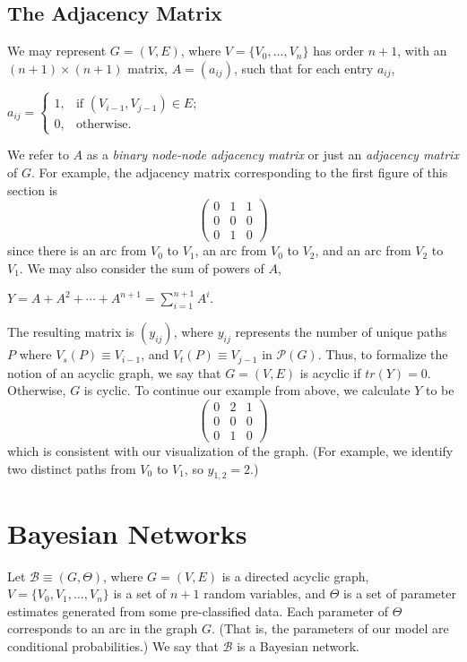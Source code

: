 \documentclass[12pt,twoside]{reedthesis}
\begin{document}
	\subsection*{The Adjacency Matrix}
	We may represent $G=(V,E)$, where $V = \{V_0, \ldots, V_{n} \}$ has order $n+1$, with an $(n+1) \times (n+1)$ matrix, $A = (a_{ij})$, such that for each entry $a_{ij}$, 
	\begin{center}
	 	$a_{ij} = 
		\begin{cases} 1, & \textrm{if\ \ \ } (V_{i-1},V_{j-1}) \in E; \\
		0, & \textrm{otherwise}. \end{cases}$
	 \end {center}
	We refer to $A$ as a {\em binary node-node adjacency matrix} or just an {\em adjacency matrix} of $G$. For example, the adjacency matrix corresponding to the first figure of this section is
	\[
	\begin{pmatrix}
	0 & 1 & 1 \\
	0 & 0 & 0 \\
	0 & 1 & 0
	\end{pmatrix} \]
	since there is an arc from $V_0$ to $V_1$, an arc from $V_0$ to $V_2$, and an arc from $V_2$ to $V_1$. We may also consider the sum of powers of $A$,
	\begin{center}
		$Y = A + A^2 + \cdots + A^{n+1} = \displaystyle\sum_{i=1}^{n+1} A^{i}$.
	\end{center}
	The resulting matrix is $(y_{ij})$, where $y_{ij}$ represents the number of unique paths $P$ where $V_s(P) \equiv V_{i-1}$, and $V_t(P) \equiv V_{j-1}$ in $\mathcal P(G)$. 
	Thus, to formalize the notion of an acyclic graph, we say that $G=(V,E)$ is acyclic if $tr(Y) = 0$. 
	Otherwise, $G$ is cyclic.
	To continue our example from above, we calculate $Y$ to be
	\[
	\begin{pmatrix}
	0 & 2 & 1 \\
	0 & 0 & 0 \\
	0 & 1 & 0
	\end{pmatrix} \]
	which is consistent with our visualization of the graph. 
	(For example, we identify two distinct paths from $V_0$ to $V_1$, so $y_{1,2} = 2$.)
	
	\section{Bayesian Networks}	
	Let $\mathcal{B} \equiv (G, \Theta)$, where $G = (V,E)$ is a directed acyclic graph, $V = \{V_0, V_1, \ldots, V_n \}$ is a set of $n + 1$ random variables, and $\Theta$ is a set of parameter estimates generated from some pre-classified data. Each parameter of $\Theta$ corresponds to an arc in the graph $G$. (That is, the parameters of our model are conditional probabilities.) We say that $\mathcal{B}$ is a Bayesian network.
\end{document}
